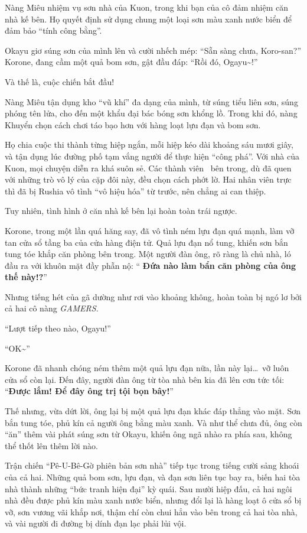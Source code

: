 \documentclass[../main.tex]{subfiles}
\begin{document}
Nàng Miêu nhiệm vụ sơn nhà của Kuon, trong khi bạn của cô đảm nhiệm căn nhà kế bên. Họ quyết định sử dụng chung một loại sơn màu xanh nước biển để đảm bảo ``tính công bằng''.

Okayu giơ súng sơn của mình lên và cười nhếch mép: ``Sẵn sàng chưa, Koro-san?'' Korone, đang cầm một quả bom sơn, gật đầu đáp: ``Rồi đó, Ogayu\~{}!''

Và thế là, cuộc chiến bắt đầu!

Nàng Miêu tận dụng kho ``vũ khí'' đa dạng của mình, từ súng tiểu liên sơn, súng phóng tên lửa, cho đến một khẩu đại bác bóng sơn khổng lồ. Trong khi đó, nàng Khuyển chọn cách chơi táo bạo hơn với hàng loạt lựu đạn và bom sơn.

Họ chia cuộc thi thành từng hiệp ngắn, mỗi hiệp kéo dài khoảng sáu mươi giây, và tận dụng lúc đường phố tạm vắng người để thực hiện ``công phá''. Với nhà của Kuon, mọi chuyện diễn ra khá suôn sẻ. Các thành viên \hll\ bên trong, dù đã quen với những trò vô lý của cặp đôi này, đều chọn cách phớt lờ. Hai nhân viên trực thì đã bị Rushia vô tình ``vô hiệu hóa'' từ trước, nên chẳng ai can thiệp.

Tuy nhiên, tình hình ở căn nhà kế bên lại hoàn toàn trái ngược.

Korone, trong một lần quá hăng say, đã vô tình ném lựu đạn quá mạnh, làm vỡ tan cửa sổ tầng ba của cửa hàng điện tử. Quả lựu đạn nổ tung, khiến sơn bắn tung tóe khắp căn phòng bên trong. Một người đàn ông, rõ ràng là chủ nhà, ló đầu ra với khuôn mặt đầy phẫn nộ: ``{\color{red} \textbf{Đứa nào làm bẩn căn phòng của ông thế này!?}}''

Nhưng tiếng hét của gã dường như rơi vào khoảng không, hoàn toàn bị ngó lơ bởi cả hai cô nàng \textit{GAMERS}.

``Lượt tiếp theo nào, Ogayu!''

``OK\~{}''

Korone đã nhanh chóng ném thêm một quả lựu đạn nữa, lần này lại\dots\ vỡ luôn cửa sổ còn lại. Đến đây, người đàn ông từ tòa nhà bên kia đã lên cơn tức tối: ``{\color{red}\textbf{Được lắm! Để đây ông trị tội bọn bây!}}''

Thế nhưng, vừa dứt lời, ông lại bị một quả lựu đạn khác đáp thẳng vào mặt. Sơn bắn tung tóe, phủ kín cả người ông bằng màu xanh. Và như thể chưa đủ, ông còn ``ăn'' thêm vài phát súng sơn từ Okayu, khiến ông ngã nhào ra phía sau, không thể thốt lên thêm lời nào.

Trận chiến ``Pê-U-Bê-Gờ phiên bản sơn nhà'' tiếp tục trong tiếng cười sảng khoái của cả hai. Những quả bom sơn, lựu đạn, và đạn sơn liên tục bay ra, biến hai tòa nhà thành những ``bức tranh hiện đại'' kỳ quái. Sau mười hiệp đấu, cả hai ngôi nhà đều được phủ kín màu xanh nước biển, nhưng đổi lại là hàng loạt ô cửa sổ bị vỡ, sơn vương vãi khắp nơi, thậm chí còn chui hẳn vào bên trong cả hai tòa nhà, và vài người đi đường bị dính đạn lạc phải lủi vội.
\end{document}
